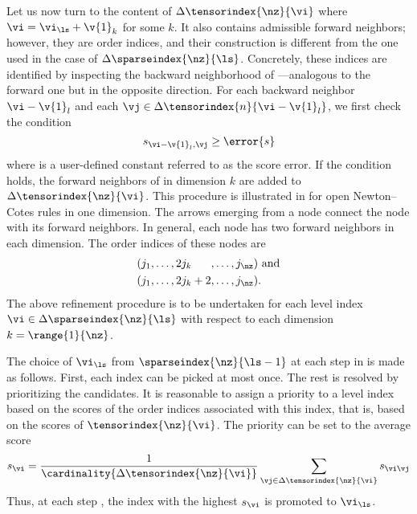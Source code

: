 Let us now turn to the content of $\Delta\tensorindex{\nz}{\vi}$ where $\vi =
\vi_{\ls} + \v{1}_k$ for some $k$. It also contains admissible forward
neighbors; however, they are order indices, and their construction is different
from the one used in the case of $\Delta\sparseindex{\nz}{\ls}$. Concretely,
these indices are identified by inspecting the backward neighborhood of
\vi---analogous to the forward one but in the opposite direction. For each
backward neighbor $\vi - \v{1}_l$ and each $\vj \in \Delta\tensorindex{n}{\vi -
\v{1}_l}$, we first check the condition
\[
  s_{\vi - \v{1}_l, \vj} \geq \error{s}
\]
where  is a user-defined constant referred to as the score error. If
the condition holds, the forward neighbors of \vj in dimension $k$ are added to
$\Delta\tensorindex{\nz}{\vi}$. This procedure is illustrated in
 for open Newton--Cotes rules in one dimension. The arrows
emerging from a node connect the node with its forward neighbors. In general,
each node has two forward neighbors in each dimension. The order indices of
these nodes are
\begin{align*}
  & (j_1, \dots, 2 j_k \phantom{{} + 2}, \dots, j_{\nz}) \text{ and} \\
  & (j_1, \dots, 2 j_k + 2,              \dots, j_{\nz}).
\end{align*}
The above refinement procedure is to be undertaken for each level index $\vi \in
\Delta\sparseindex{\nz}{\ls}$ with respect to each dimension $k =
\range{1}{\nz}$.

The choice of $\vi_{\ls}$ from $\sparseindex{\nz}{\ls - 1}$ at each step \ls in
 is made as follows. First, each index can be picked at most
once. The rest is resolved by prioritizing the candidates. It is reasonable to
assign a priority to a level index \vi based on the scores of the order indices
associated with this index, that is, based on the scores of
$\tensorindex{\nz}{\vi}$. The priority can be set to the average score
\[
  s_{\vi} = \frac{1}{\cardinality{\Delta\tensorindex{\nz}{\vi}}} \sum_{\vj \in \Delta\tensorindex{\nz}{\vi}} s_{\vi \vj}
\]
Thus, at each step \ls, the index \vi with the highest $s_{\vi}$ is promoted to
$\vi_{\ls}$.

